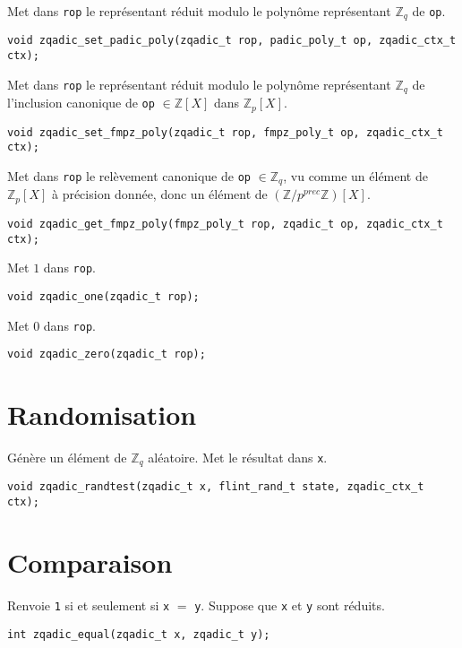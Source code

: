 \documentclass[11pt]{article}
\begin{document}
Met dans \texttt{rop} le représentant réduit modulo le polynôme représentant $\mathbb{Z}_q$ de \texttt{op}.
\begin{verbatim}
void zqadic_set_padic_poly(zqadic_t rop, padic_poly_t op, zqadic_ctx_t ctx);
\end{verbatim}

Met dans \texttt{rop} le représentant réduit modulo le polynôme représentant $\mathbb{Z}_q$ de l'inclusion canonique de \texttt{op} $\in \mathbb{Z}[X]$ dans $\mathbb{Z}_p[X]$.
\begin{verbatim}
void zqadic_set_fmpz_poly(zqadic_t rop, fmpz_poly_t op, zqadic_ctx_t ctx);
\end{verbatim}

Met dans \texttt{rop} le relèvement canonique de \texttt{op} $\in \mathbb{Z}_q$, vu comme un élément de $\mathbb{Z}_p[X]$ à précision donnée, donc un élément de $(\mathbb{Z}/p^{prec} \mathbb{Z})[X]$.
\begin{verbatim}
void zqadic_get_fmpz_poly(fmpz_poly_t rop, zqadic_t op, zqadic_ctx_t ctx);
\end{verbatim}

Met $1$ dans \texttt{rop}.
\begin{verbatim}
void zqadic_one(zqadic_t rop);
\end{verbatim}

Met $0$ dans \texttt{rop}.
\begin{verbatim}
void zqadic_zero(zqadic_t rop);
\end{verbatim}


\section{Randomisation}

Génère un élément de $\mathbb{Z}_q$ aléatoire. Met le résultat dans \texttt{x}.
\begin{verbatim}
void zqadic_randtest(zqadic_t x, flint_rand_t state, zqadic_ctx_t ctx);
\end{verbatim}


\section{Comparaison}

Renvoie \texttt{1} si et seulement si \texttt{x} $=$ \texttt{y}. Suppose que \texttt{x} et \texttt{y} sont réduits.
\begin{verbatim}
int zqadic_equal(zqadic_t x, zqadic_t y);
\end{verbatim}
\end{document}
